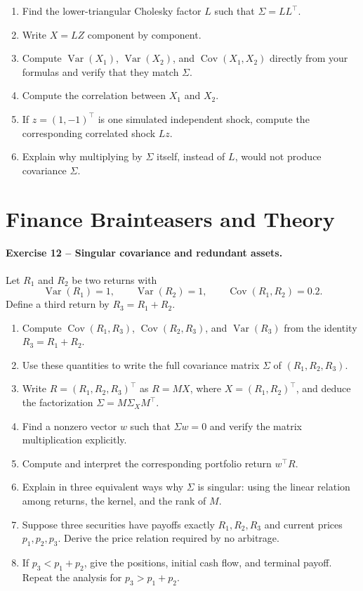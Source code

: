\documentclass[10pt]{article}
\newcommand{\Var}{\operatorname{Var}}
\newcommand{\Cov}{\operatorname{Cov}}
\begin{document}
\begin{enumerate}
\item Find the lower-triangular Cholesky factor $L$ such that
$\Sigma=LL^\top$.
\item Write $X=LZ$ component by component.
\item Compute $\Var(X_1)$, $\Var(X_2)$, and $\Cov(X_1,X_2)$ directly from
your formulas and verify that they match $\Sigma$.
\item Compute the correlation between $X_1$ and $X_2$.
\item If $z=(1,-1)^\top$ is one simulated independent shock, compute the
corresponding correlated shock $Lz$.
\item Explain why multiplying by $\Sigma$ itself, instead of $L$, would not
produce covariance $\Sigma$.
\end{enumerate}

\section{Finance Brainteasers and Theory}

\paragraph{Exercise 12 -- Singular covariance and redundant assets.}
Let $R_1$ and $R_2$ be two returns with
\[
\Var(R_1)=1,\qquad \Var(R_2)=1,\qquad \Cov(R_1,R_2)=0.2.
\]
Define a third return by $R_3=R_1+R_2$.

\begin{enumerate}
\item Compute $\Cov(R_1,R_3)$, $\Cov(R_2,R_3)$, and $\Var(R_3)$ from the
identity $R_3=R_1+R_2$.
\item Use these quantities to write the full covariance matrix $\Sigma$ of
$(R_1,R_2,R_3)$.
\item Write $R=(R_1,R_2,R_3)^\top$ as $R=MX$, where
$X=(R_1,R_2)^\top$, and deduce the factorization
$\Sigma=M\Sigma_XM^\top$.
\item Find a nonzero vector $w$ such that $\Sigma w=0$ and verify the matrix
multiplication explicitly.
\item Compute and interpret the corresponding portfolio return $w^\top R$.
\item Explain in three equivalent ways why $\Sigma$ is singular: using the
linear relation among returns, the kernel, and the rank of $M$.
\item Suppose three securities have payoffs exactly $R_1,R_2,R_3$ and current
prices $p_1,p_2,p_3$. Derive the price relation required by no arbitrage.
\item If $p_3<p_1+p_2$, give the positions, initial cash flow, and terminal
payoff. Repeat the analysis for $p_3>p_1+p_2$.
\end{enumerate}
\end{document}

